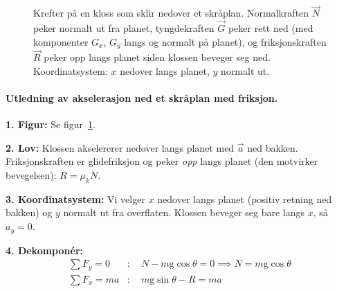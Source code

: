 \begin{figure}[ht!]
    \caption{Krefter på en kloss som sklir nedover et skråplan. Normalkraften $\vec{N}$ peker normalt ut fra planet, tyngdekraften $\vec{G}$ peker rett ned (med komponenter $G_x$, $G_y$ langs og normalt på planet), og friksjonskraften $\vec{R}$ peker opp langs planet siden klossen beveger seg ned. Koordinatsystem: $x$ nedover langs planet, $y$ normalt ut.}
    \label{fig:skråplankrefter1}
\end{figure}

\paragraph*{Utledning av akselerasjon ned et skråplan med friksjon.}

\noindent
\textbf{1. Figur:} Se figur~\ref{fig:skråplankrefter1}.

\smallskip\noindent
\textbf{2. Lov:} Klossen akselererer nedover langs planet med $\vec{a}$ ned bakken. Friksjonskraften er glidefriksjon og peker \textit{opp} langs planet (den motvirker bevegelsen): $R = \mu_k N$.

\smallskip\noindent
\textbf{3. Koordinatsystem:} Vi velger $x$ nedover langs planet (positiv retning ned bakken) og $y$ normalt ut fra overflaten. Klossen beveger seg bare langs $x$, så $a_y = 0$.

\smallskip\noindent
\textbf{4. Dekomponér:}
\begin{align*}
    \sum F_y = 0 &:\quad N - m\mathrm{g}\cos\theta = 0 \implies N = m\mathrm{g}\cos\theta\\
    \sum F_x = ma &:\quad m\mathrm{g}\sin\theta - R = ma
\end{align*}

